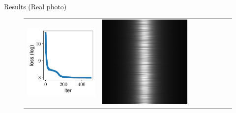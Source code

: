 \documentclass[final]{beamer}
\newlength{\twocolwid}
\newlength{\resultwidth}
\begin{document}
\begin{frame}[t]
\begin{columns}[t]
\begin{column}{\twocolwid}
\begin{block}{Results (Real photo)}
\begin{figure}[t]
\begin{tabular}{ccrclccc}
            		\includegraphics[width=\resultwidth]{images/real/metal/loss.pdf} &
            		\includegraphics[width=\resultwidth]{images/real/metal/optim.jpg} &

\end{tabular}
\end{figure}
\end{block}
\end{column}
\end{columns}
\end{frame}
\end{document}
